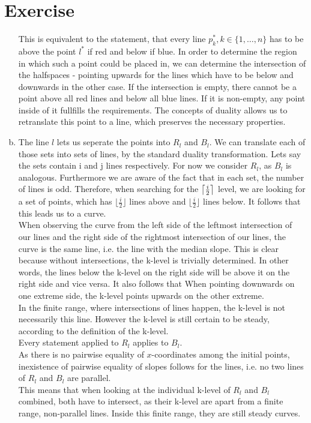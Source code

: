 \documentclass{article}
\DeclarePairedDelimiter{\ceil}{\lceil}{\rceil}
\newcounter{homeworkProblemCounter} %
\newcommand{\homeworkProblemName}{}
\newenvironment{homeworkProblem}[1][Exercise \arabic{homeworkProblemCounter}]{ %
\stepcounter{homeworkProblemCounter} %
\renewcommand{\homeworkProblemName}{#1} %
\section{\homeworkProblemName} %
}{
}
\begin{document}
\begin{homeworkProblem}
\begin{enumerate}[(a)]
\[	\]
	This is equivalent to the statement, that every line $p_k^*, k \in \{1, \dots, n\}$ has to be above the point $l^*$ if red and below if blue. In order to determine the region in which such a point could be placed in, we can determine the intersection of the halfspaces - pointing upwards for the lines which have to be below and downwards in the other case. If the intersection is empty, there cannot be a point above all red lines and below all blue lines. If it is non-empty, any point inside of it fullfills the requirements. The concepts of duality allows us to retranslate this point to a line, which preserves the necessary properties. 
\item %
The line $l$ lets us seperate the points into $R_l$ and $B_l$. We can translate each of those sets into sets of lines, by the standard duality transformation. Lets say the sets contain i and j lines respectively. For now we consider $R_l$, as $B_l$ is analogous. Furthermore we are aware of the fact that in each set, the number of lines is odd.  Therefore, when searching for the $\ceil[\big]{\frac{i}{2}}$ level, we are looking for a set of points, which has $ \lfloor \frac{i}{2} \rfloor$ lines above and $ \lfloor \frac{i}{2} \rfloor$ lines below. It follows that this leads us to a curve.  \\
When observing the curve from the left side of the leftmost intersection of our lines and the right side of the rightmost intersection of our lines, the curve is the same line, i.e. the line with the median slope. This is clear because without intersections, the k-level is trivially determined. In other words, the lines below the k-level on the right side will be above it on the right side and vice versa. It also follows that When pointing downwards on one extreme side, the k-level points upwards on the other extreme.\\
In the finite range, where intersections of lines happen, the k-level is not necessarily this line. However the k-level is still certain to be steady, according to the definition of the k-level. \\
Every statement applied to $R_l$ applies to $B_l$. \\
As there is no pairwise equality of $x$-coordinates among the initial points, inexistence of pairwise equality of slopes follows for the lines, i.e. no two lines of $R_l$ and $B_l$ are parallel. \\
This means that when looking at the individual k-level of $R_l$ and $B_l$ combined, both have to intersect, as their k-level are apart from a finite range, non-parallel lines. Inside this finite range, they are still steady curves. \\

\end{enumerate}
\end{homeworkProblem}
\end{document}

